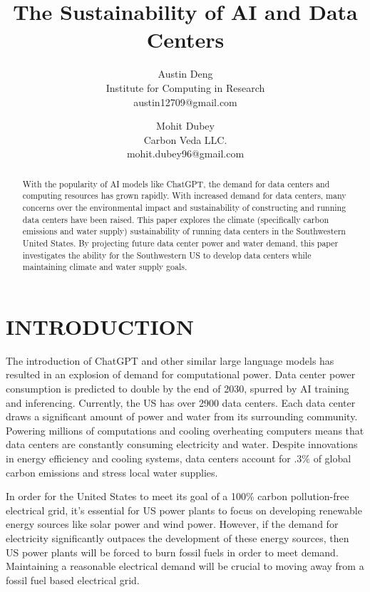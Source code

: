 \documentclass[letterpaper, 12 pt]{article}  %
\title{\LARGE \bf
The Sustainability of AI and Data Centers
}
\author{
Austin Deng\\
\small Institute for Computing in Research \\
\small austin12709@gmail.com
\and  
Mohit Dubey\\
\small Carbon Veda LLC.\\
\small mohit.dubey96@gmail.com
}
\begin{document}
\maketitle
\thispagestyle{empty}
\pagestyle{empty}


\begin{abstract}


With the popularity of AI models like ChatGPT, the demand for data centers and computing resources has grown rapidly. With increased demand for data centers, many concerns over the environmental impact and sustainability of constructing and running data centers have been raised. This paper explores the climate (specifically carbon emissions and water supply) sustainability of running data centers in the Southwestern United States. By projecting future data center power and water demand, this paper investigates the ability for the Southwestern US to develop data centers while maintaining climate and water supply goals. 



\end{abstract}


\section{INTRODUCTION}

The introduction of ChatGPT and other similar large language models has resulted in an explosion of demand for computational power. Data center power consumption is predicted to double by the end of 2030, spurred by AI training and inferencing\cite{GSDemand}. Currently, the US has over 2900 data centers\cite{DCStats}. Each data center draws a significant amount of power and water from its surrounding community\cite{UTDC}. Powering millions of computations and cooling overheating computers means that data centers are constantly consuming electricity and water. Despite innovations in energy efficiency and cooling systems, data centers account for .3\% of global carbon emissions and stress local water supplies\cite{CloudImpact}. 

In order for the United States to meet its goal of a 100\% carbon pollution-free electrical grid, it's essential for US power plants to focus on developing renewable energy sources like solar power and wind power. However, if the demand for electricity significantly outpaces the development of these energy sources, then US power plants will be forced to burn fossil fuels in order to meet demand. Maintaining a reasonable electrical demand will be crucial to moving away from a fossil fuel based electrical grid. 
\end{document}
